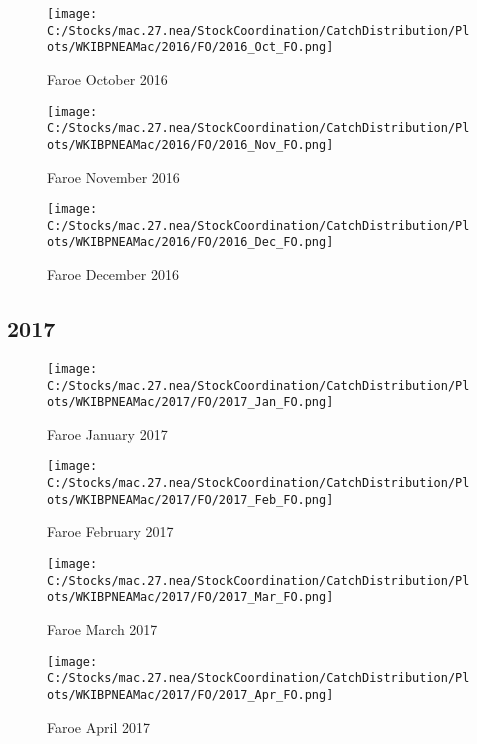 \documentclass{article}
\begin{document}
\begin{figure}
	\centering
		\texttt{[image: C:/Stocks/mac.27.nea/StockCoordination/CatchDistribution/Plots/WKIBPNEAMac/2016/FO/2016\_Oct\_FO.png]}
	\caption{Faroe October 2016}
	\label{fig:2016_Oct_FO}
\end{figure}

\begin{figure}
	\centering
		\texttt{[image: C:/Stocks/mac.27.nea/StockCoordination/CatchDistribution/Plots/WKIBPNEAMac/2016/FO/2016\_Nov\_FO.png]}
	\caption{Faroe November 2016}
	\label{fig:2016_Nov_FO}
\end{figure}

\begin{figure}
	\centering
		\texttt{[image: C:/Stocks/mac.27.nea/StockCoordination/CatchDistribution/Plots/WKIBPNEAMac/2016/FO/2016\_Dec\_FO.png]}
	\caption{Faroe December 2016}
	\label{fig:2016_Dec_FO}
\end{figure}


\clearpage

\newpage

\subsection{2017}



\begin{figure}[h]
	\centering
		\texttt{[image: C:/Stocks/mac.27.nea/StockCoordination/CatchDistribution/Plots/WKIBPNEAMac/2017/FO/2017\_Jan\_FO.png]}
	\caption{Faroe January 2017}
	\label{fig:2017_Jan_FO}
\end{figure}

\begin{figure}
	\centering
		\texttt{[image: C:/Stocks/mac.27.nea/StockCoordination/CatchDistribution/Plots/WKIBPNEAMac/2017/FO/2017\_Feb\_FO.png]}
	\caption{Faroe February 2017}
	\label{fig:2017_Feb_FO}
\end{figure}

\begin{figure}
	\centering
		\texttt{[image: C:/Stocks/mac.27.nea/StockCoordination/CatchDistribution/Plots/WKIBPNEAMac/2017/FO/2017\_Mar\_FO.png]}
	\caption{Faroe March 2017}
	\label{fig:2017_Mar_FO}
\end{figure}

\begin{figure}
	\centering
		\texttt{[image: C:/Stocks/mac.27.nea/StockCoordination/CatchDistribution/Plots/WKIBPNEAMac/2017/FO/2017\_Apr\_FO.png]}
	\caption{Faroe April 2017}
	\label{fig:2017_Apr_FO}
\end{figure}
\end{document}
